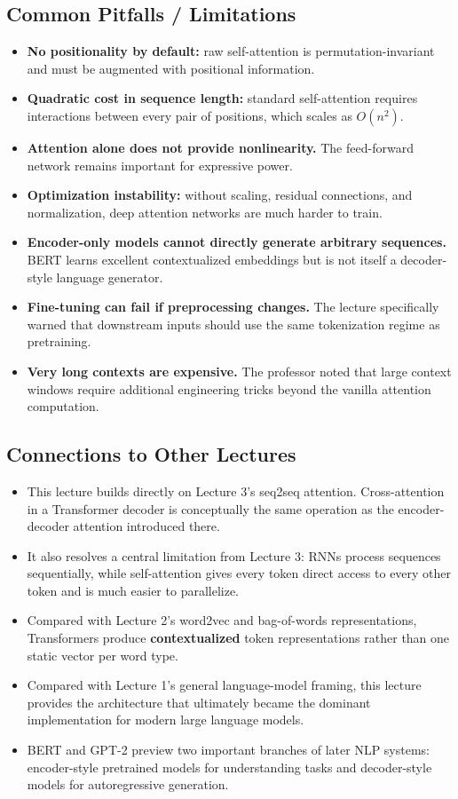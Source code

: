 \documentclass[11pt]{article}
\begin{document}
\subsection{Common Pitfalls / Limitations}
\begin{itemize}
    \item \textbf{No positionality by default:} raw self-attention is permutation-invariant and must be augmented with positional information.
    \item \textbf{Quadratic cost in sequence length:} standard self-attention requires interactions between every pair of positions, which scales as \(O(n^2)\).
    \item \textbf{Attention alone does not provide nonlinearity.} The feed-forward network remains important for expressive power.
    \item \textbf{Optimization instability:} without scaling, residual connections, and normalization, deep attention networks are much harder to train.
    \item \textbf{Encoder-only models cannot directly generate arbitrary sequences.} BERT learns excellent contextualized embeddings but is not itself a decoder-style language generator.
    \item \textbf{Fine-tuning can fail if preprocessing changes.} The lecture specifically warned that downstream inputs should use the same tokenization regime as pretraining.
    \item \textbf{Very long contexts are expensive.} The professor noted that large context windows require additional engineering tricks beyond the vanilla attention computation.
\end{itemize}

\subsection{Connections to Other Lectures}
\begin{itemize}
    \item This lecture builds directly on Lecture 3's seq2seq attention. Cross-attention in a Transformer decoder is conceptually the same operation as the encoder-decoder attention introduced there.
    \item It also resolves a central limitation from Lecture 3: RNNs process sequences sequentially, while self-attention gives every token direct access to every other token and is much easier to parallelize.
    \item Compared with Lecture 2's word2vec and bag-of-words representations, Transformers produce \textbf{contextualized} token representations rather than one static vector per word type.
    \item Compared with Lecture 1's general language-model framing, this lecture provides the architecture that ultimately became the dominant implementation for modern large language models.
    \item BERT and GPT-2 preview two important branches of later NLP systems: encoder-style pretrained models for understanding tasks and decoder-style models for autoregressive generation.
\end{itemize}
\end{document}
